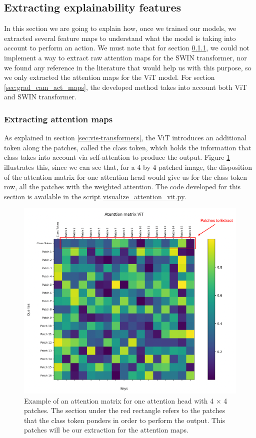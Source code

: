 \subsection{Extracting explainability features}
In this section we are going to explain how, once we trained our models, we extracted several feature maps to understand what the model is taking into account to perform an action. We must note that for section \ref{sec:extracting_attn_maps}, we could not implement a way to extract raw attention maps for the SWIN transformer, nor we found any reference in the literature that would help us with this purpose, so we only extracted the attention maps for the ViT model. For section \ref{sec:grad_cam_act_maps}, the developed method takes into account both ViT and SWIN transformer.

\subsubsection{Extracting attention maps}
\label{sec:extracting_attn_maps}
As explained in section \ref{sec:vis-transformers}, the ViT introduces an additional token along the patches, called the class token, which holds the information that class takes into account via self-attention to produce the output. Figure \ref{fig:classtokenattention} illustrates this, since we can see that, for a 4 by 4 patched image, the disposition of the attention matrix for one attention head would give us for the class token row, all the patches with the weighted attention. The code developed for this section is available in the script \href{https://github.com/Javimh18/DL_TFM/blob/main/src/visualize_attention_vit.py}{visualize\_attention\_vit.py}.

\begin{figure}[!h]
	\centering
	\includegraphics[width=0.7\linewidth]{figures/class_token_attention}
	\caption{Example of an attention matrix for one attention head with 4 $\times$ 4 patches. The section under the red rectangle refers to the patches that the class token ponders in order to perform the output. This patches will be our extraction for the attention maps.}
	\label{fig:classtokenattention}
\end{figure}

